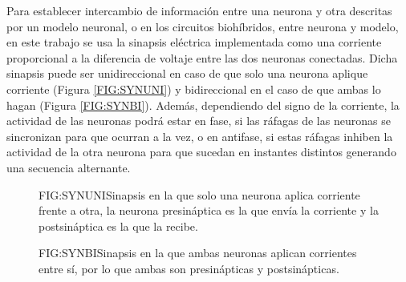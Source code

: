 
Para establecer intercambio de información entre una neurona y otra descritas por un modelo neuronal, o en los circuitos biohíbridos, entre neurona y modelo, en este trabajo se usa la sinapsis eléctrica implementada como una corriente proporcional a la diferencia de voltaje entre las dos neuronas conectadas\cite{Reyes-Sanchez2020}. Dicha sinapsis puede ser unidireccional en caso de que solo una neurona aplique corriente (Figura \ref{FIG:SYNUNI}) y bidireccional en el caso de que ambas lo hagan (Figura \ref{FIG:SYNBI}). Además, dependiendo del signo de la corriente,  la actividad de las neuronas podrá estar en fase, si las ráfagas de las neuronas se sincronizan para que ocurran a la vez, o en antifase, si estas ráfagas inhiben la actividad de la otra neurona para que sucedan en instantes distintos generando una secuencia alternante.  

\begin{figure}[Esquema de sinapsis unidireccional]{FIG:SYNUNI}{Sinapsis en la que solo una neurona aplica corriente frente a otra, la neurona presináptica es la que envía la corriente y la postsináptica es la que la recibe.}
\end{figure}

\begin{figure}[Esquema de sinapsis bidireccional]{FIG:SYNBI}{Sinapsis en la que ambas neuronas aplican corrientes entre sí, por lo que ambas son presinápticas y postsinápticas.}
\end{figure}